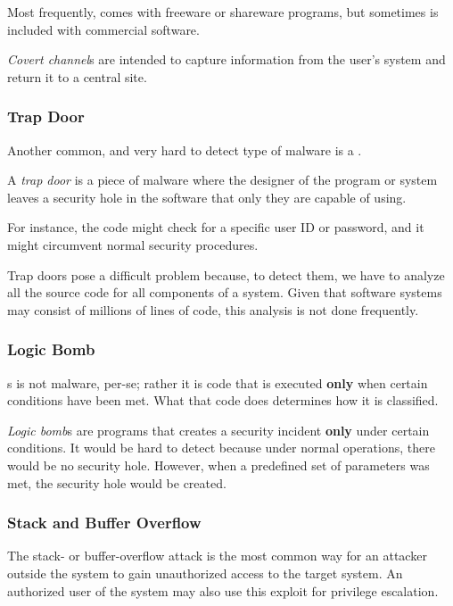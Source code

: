 Most frequently,  comes with freeware or shareware programs, but sometimes is included with commercial software.

\begin{definition}\label{def:Covert_Channel}
  \emph{Covert channel}s are intended to capture information from the user’s system and return it to a central site.
\end{definition}

\subsubsection{Trap Door}\label{subsubsec:Trap_Door}
Another common, and very hard to detect type of malware is a .
\begin{definition}\label{def:Trap_Door}
  A \emph{trap door} is a piece of malware where the designer of the program or system leaves a security hole in the software that only they are capable of using.
\end{definition}

For instance, the code might check for a specific user ID or password, and it might circumvent normal security procedures.

Trap doors pose a difficult problem because, to detect them, we have to analyze all the source code for all components of a system.
Given that software systems may consist of millions of lines of code, this analysis is not done frequently.

\subsubsection{Logic Bomb}\label{subsubsec:Logic_Bomb}
s is not malware, per-se; rather it is code that is executed \textbf{only} when certain conditions have been met.
What that code does determines how it is classified.

\begin{definition}\label{def:Logic_Bomb}
  \emph{Logic bomb}s are programs that creates a security incident \textbf{only} under certain conditions.
  It would be hard to detect because under normal operations, there would be no security hole.
  However, when a predefined set of parameters was met, the security hole would be created.
\end{definition}

\subsubsection{Stack and Buffer Overflow}\label{subsubsec:Stack_Buffer_Overflow}
The stack- or buffer-overflow attack is the most common way for an attacker outside the system to gain unauthorized access to the target system.
An authorized user of the system may also use this exploit for privilege escalation.

